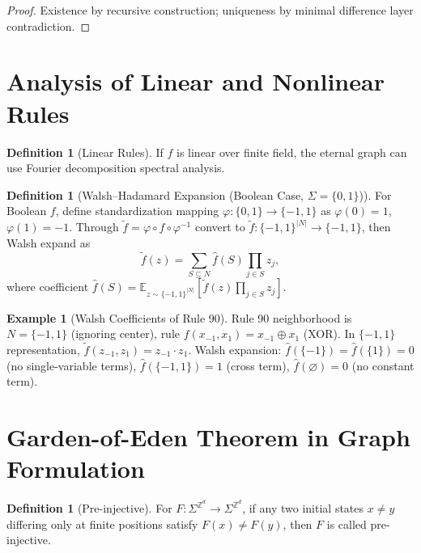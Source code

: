 \documentclass[11pt]{article}
\theoremstyle{definition}
\newtheorem{definition}[theorem]{Definition}
\newtheorem{example}[theorem]{Example}
\theoremstyle{remark}
\begin{document}
\begin{proof}
Existence by recursive construction; uniqueness by minimal difference layer contradiction.
\end{proof}

\section{Analysis of Linear and Nonlinear Rules}\label{sec:linear}

\begin{definition}[Linear Rules]\label{def:linear}
If \( f \) is linear over finite field, the eternal graph can use Fourier decomposition spectral analysis.
\end{definition}

\begin{definition}[Walsh--Hadamard Expansion (Boolean Case, \( \Sigma=\{0,1\} \))]\label{def:walsh}
For Boolean \( f \), define standardization mapping \( \varphi: \{0,1\} \to \{-1,1\} \) as \( \varphi(0) = 1 \), \( \varphi(1) = -1 \). Through \( \tilde{f} = \varphi \circ f \circ \varphi^{-1} \) convert to \( \tilde{f}: \{-1,1\}^{|N|} \to \{-1,1\} \), then Walsh expand as
\[
\tilde{f}(z) = \sum_{S \subseteq N} \hat{f}(S) \prod_{j \in S} z_j,
\]
where coefficient \( \hat{f}(S) = \mathbb{E}_{z \sim \{-1,1\}^{|N|}}[\tilde{f}(z) \prod_{j \in S} z_j] \).
\end{definition}

\begin{example}[Walsh Coefficients of Rule 90]\label{ex:rule90}
Rule 90 neighborhood is \( N=\{-1,1\} \) (ignoring center), rule \( f(x_{-1},x_1)=x_{-1}\oplus x_1 \) (XOR). In \( \{-1,1\} \) representation, \( \tilde{f}(z_{-1},z_1)=z_{-1}\cdot z_1 \). Walsh expansion: \( \hat{f}(\{-1\})=\hat{f}(\{1\})=0 \) (no single-variable terms), \( \hat{f}(\{-1,1\})=1 \) (cross term), \( \hat{f}(\varnothing)=0 \) (no constant term).
\end{example}

\section{Garden-of-Eden Theorem in Graph Formulation}\label{sec:garden}

\begin{definition}[Pre-injective]\label{def:preinj}
For \( F:\Sigma^{\mathbb Z^d}\to\Sigma^{\mathbb Z^d} \), if any two initial states \( x\ne y \) differing only at finite positions satisfy \( F(x)\ne F(y) \), then \( F \) is called pre-injective.
\end{definition}
\end{document}
